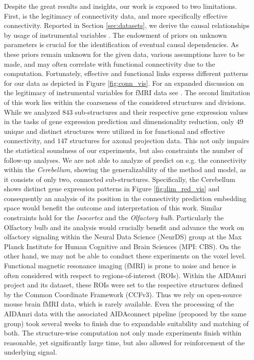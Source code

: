 \documentclass[]{article}
\renewcommand{\cite}{\citep}
\begin{document}
Despite the great results and insights, our work is exposed to two limitations. First, is the legitimacy of connectivity data, and more specifically effective connectivity. Reported in Section \ref{sec:datasets}, we derive the causal relationships by usage of instrumental variables \cite{angrist2009mostly, pearl2009causality, baiocchi2014instrumental}. The endowment of priors on unknown parameters is crucial for the identification of eventual causal dependencies. As these priors remain unknown for the given data, various assumptions have to be made, and may often correlate with functional connectivity due to the computation. Fortunately, effective and functional links express different patterns for our data as depicted in Figure \ref{fig:conn_vis}. For an expanded discussion on the legitimacy of instrumental variables for fMRI data see \citet{valdes2011effective}.
The second limitation of this work lies within the coarseness of the considered structures and divisions. While we analyzed $843$ sub-structures and their respective gene expression values in the tasks of gene expression prediction and dimensionality reduction, only $49$ unique and distinct structures were utilized in \citet{AIDAmri2019} for functional and effective connectivity, and $147$ structures for axonal projection data. This not only impairs the statistical soundness of our experiments, but also constraints the number of follow-up analyses. We are not able to analyze of predict on e.g. the connectivity within the \textit{Cerebellum}, showing the generalizability of the method and model, as it consists of only two, connected sub-structures. Specifically, the Cerebellum shows distinct gene expression patterns in Figure \ref{fig:dim_red_vis} and consequently an analysis of its position in the connectivity prediction embedding space would benefit the outcome and interpretation of this work. Similar constraints hold for the \textit{Isocortex} and the \textit{Olfactory bulb}. Particularly the Olfactory bulb and its analysis would crucially benefit and advance the work on olfactory signaling within the Neural Data Science (NeurDS) group at the Max Planck Institute for Human Cognitive and Brain Sciences (MPI: CBS).
On the other hand, we may not be able to conduct these experiments on the voxel level. Functional magnetic resonance imaging (fMRI) is prone to noise and hence is often considered with respect to regions-of-interest (ROIs). Within the AIDAmri project \cite{AIDAmri2019} and its dataset, these ROIs were set to the respective structures defined by the Common Coordinate Framework (CCFv3). Thus we rely on open-source mouse brain fMRI data, which is rarely available. Even the processing of the AIDAmri data with the associated AIDAconnect  pipeline (proposed by the same group) took several weeks to finish due to expandable suitability and matching of both. The structure-wise computation not only made experiments finish within reasonable, yet significantly large time, but also allowed for reinforcement of the underlying signal.
\end{document}
